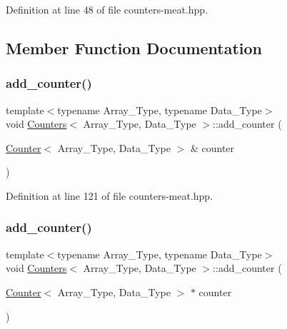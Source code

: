 Definition at line 48 of file counters-\/meat.\+hpp.



\subsection{Member Function Documentation}
\mbox{\label{class_counters_a5b5dafc7a3e0eedae400457f69937613}} 
\subsubsection{\texorpdfstring{add\+\_\+counter()}{add\_counter()}\hspace{0.1cm}{\footnotesize\ttfamily [1/3]}}
{\footnotesize\ttfamily template$<$typename Array\+\_\+\+Type, typename Data\+\_\+\+Type$>$ \\
void \hyperlink{class_counters}{Counters}$<$ Array\+\_\+\+Type, Data\+\_\+\+Type $>$\+::add\+\_\+counter (\begin{DoxyParamCaption}\item[{\hyperlink{class_counter}{Counter}$<$ Array\+\_\+\+Type, Data\+\_\+\+Type $>$ \&}]{counter }\end{DoxyParamCaption})\hspace{0.3cm}{\ttfamily [inline]}}



Definition at line 121 of file counters-\/meat.\+hpp.

\mbox{\label{class_counters_a74f054aa9ea64103c2d9f79f115777d4}} 
\subsubsection{\texorpdfstring{add\+\_\+counter()}{add\_counter()}\hspace{0.1cm}{\footnotesize\ttfamily [2/3]}}
{\footnotesize\ttfamily template$<$typename Array\+\_\+\+Type, typename Data\+\_\+\+Type$>$ \\
void \hyperlink{class_counters}{Counters}$<$ Array\+\_\+\+Type, Data\+\_\+\+Type $>$\+::add\+\_\+counter (\begin{DoxyParamCaption}\item[{\hyperlink{class_counter}{Counter}$<$ Array\+\_\+\+Type, Data\+\_\+\+Type $>$ $\ast$}]{counter }\end{DoxyParamCaption})\hspace{0.3cm}{\ttfamily [inline]}}



